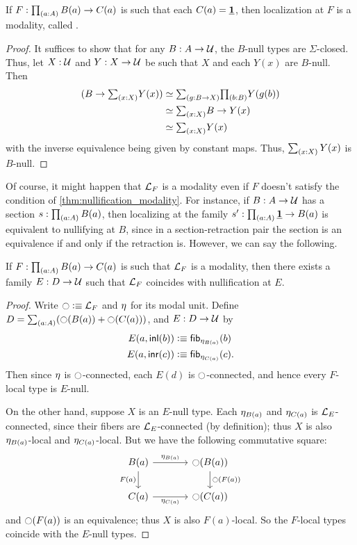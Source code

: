 \begin{thm}\label{thm:nullification_modality}
  If $F:\prd{a:A} B(a) \to C(a)$ is such that each $C(a)=\unit$, then localization at $F$ is a modality, called .
\end{thm}
\begin{proof}
  It suffices to show that for any $B:A\to\UU$, the $B$-null types are $\Sigma$-closed.
  Thus, let $X:\UU$ and $Y:X\to \UU$ be such that $X$ and each $Y(x)$ are $B$-null.
  Then
  \begin{align*}
    (B\to \sm{x:X} Y(x))
    &\eqvsym \sm{g:B\to X} \prd{b:B} Y(g(b)) \\
    &\eqvsym \sm{x:X} B \to Y(x) \\
    &\eqvsym \sm{x:X} Y(x)
  \end{align*}
  with the inverse equivalence being given by constant maps.
  Thus, $\sm{x:X} Y(x)$ is $B$-null.
\end{proof}

Of course, it might happen that $\localization{F}$ is a modality even if $F$ doesn't satisfy the condition of \cref{thm:nullification_modality}.
For instance, if $B:A\to \UU$ has a section $s:\prd{a:A} B(a)$, then localizing at the family $s' : \prd{a:A} \unit \to B(a)$ is equivalent to nullifying at $B$, since in a section-retraction pair the section is an equivalence if and only if the retraction is.
However, we can say the following.

\begin{lem}\label{thm:acc-modal}
  If $F:\prd{a:A} B(a)\to C(a)$ is such that $\localization{F}$ is a modality, then there exists a family $E:D\to \UU$ such that $\localization{F}$ coincides with nullification at $E$.
\end{lem}
\begin{proof}
  Write $\modal\defeq\localization{F}$ and $\modalunit$ for its modal unit.
  Define $D = \sm{a:A} (\modal (B(a)) + \modal(C(a)))$, and $E:D\to \UU$ by
  \begin{align*}
    E(a,\inl(b)) &\defeq \fib{\modalunit[B(a)]}{b}\\
    E(a,\inr(c)) &\defeq \fib{\modalunit[C(a)]}{c}.
  \end{align*}
  Then since $\modalunit$ is $\modal$-connected, each $E(d)$ is $\modal$-connected, and hence every $F$-local type is $E$-null.

  On the other hand, suppose $X$ is an $E$-null type.
  Each $\modalunit[B(a)]$ and $\modalunit[C(a)]$ is $\localization{E}$-connected, since their fibers are $\localization{E}$-connected (by definition); thus $X$ is also $\modalunit[B(a)]$-local and $\modalunit[C(a)]$-local.
  But we have the following commutative square:
  \[
  \begin{tikzcd}[column sep=large]
    B(a) \ar[r,"{\modalunit[B(a)]}"] \ar[d,"F(a)"'] & \modal(B(a)) \ar[d,"{\modal(F(a))}"]\\
    C(a) \ar[r,"{\modalunit[C(a)]}"'] & \modal(C(a))
  \end{tikzcd}
  \]
  and ${\modal(F(a))}$ is an equivalence; thus $X$ is also $F(a)$-local.
  So the $F$-local types coincide with the $E$-null types.
\end{proof}

